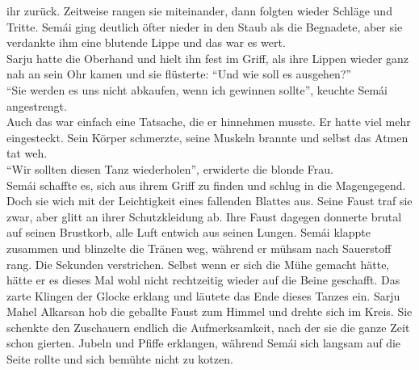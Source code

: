 ihr zurück. Zeitweise rangen sie miteinander, dann folgten wieder Schläge und Tritte. Semái ging 
deutlich öfter nieder in den Staub als die Begnadete, aber sie verdankte ihm eine blutende Lippe 
und das war es wert. \\
Sarju hatte die Oberhand und hielt ihn fest im Griff, als ihre Lippen wieder ganz nah an sein Ohr 
kamen und sie flüsterte: ``Und wie soll es ausgehen?''\\
``Sie werden es uns nicht abkaufen, wenn ich gewinnen sollte'', keuchte Semái angestrengt.\\
Auch das war einfach eine Tatsache, die er hinnehmen musste. Er hatte viel mehr eingesteckt. Sein 
Körper schmerzte, seine Muskeln brannte und selbst das Atmen tat weh.\\
``Wir sollten diesen Tanz wiederholen'', erwiderte die blonde Frau.\\
Semái schaffte es, sich aus ihrem Griff zu finden und schlug in die Magengegend. Doch sie wich mit 
der Leichtigkeit eines fallenden Blattes aus. Seine Faust traf sie zwar, aber glitt an ihrer 
Schutzkleidung ab. Ihre Faust dagegen donnerte brutal auf seinen Brustkorb, alle Luft entwich aus 
seinen Lungen. Semái klappte zusammen und blinzelte die Tränen weg, während er mühsam nach 
Sauerstoff rang. Die Sekunden verstrichen. Selbst wenn er sich die Mühe gemacht hätte, hätte er es 
dieses Mal wohl nicht rechtzeitig wieder auf die Beine geschafft. Das zarte Klingen der Glocke 
erklang und läutete das Ende dieses Tanzes ein. Sarju Mahel Alkarsan hob die geballte Faust zum 
Himmel und drehte sich im Kreis. Sie schenkte den Zuschauern endlich die Aufmerksamkeit, nach der 
sie die ganze Zeit schon gierten. Jubeln und Pfiffe erklangen, während Semái sich langsam auf die 
Seite rollte und sich bemühte nicht zu kotzen. \\



